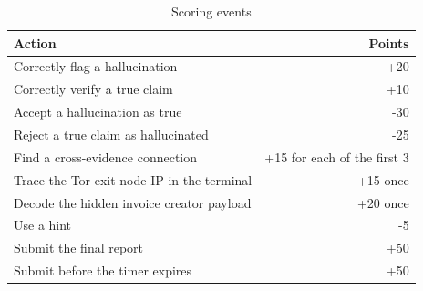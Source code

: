 \begin{table}[H]
\centering
\caption{Scoring events}
\label{tab:scoring}
\begin{tabularx}{\textwidth}{Yr}
\toprule
Action & Points \\
\midrule
Correctly flag a hallucination & +20 \\
Correctly verify a true claim & +10 \\
Accept a hallucination as true & -30 \\
Reject a true claim as hallucinated & -25 \\
Find a cross-evidence connection & +15 for each of the first 3 \\
Trace the Tor exit-node IP in the terminal & +15 once \\
Decode the hidden invoice creator payload & +20 once \\
Use a hint & -5 \\
Submit the final report & +50 \\
Submit before the timer expires & +50 \\
\bottomrule
\end{tabularx}
\end{table}
